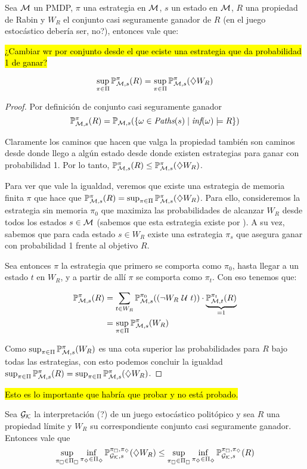 \begin{lemma}
	\label{PMDP-supWR}
	Sea $\mathcal{M}$ un PMDP, $\pi$ una estrategia en $\mathcal{M}$, $s$ un estado en $\mathcal{M}$, $R$ una propiedad de Rabin y $W_R$ el conjunto casi seguramente ganador de $R$ (en el juego estocástico debería ser, no?), entonces vale que:


	\hl{¿Cambiar wr por conjunto desde el que eciste una estrategia que da probabilidad 1 de ganar?}

	$$
		\sup_{\pi \in \Pi} \mathbb{P}_{\mathcal{M}, s}^\pi (R) = \sup_{\pi \in \Pi} \mathbb{P}_{\mathcal{M}, s}^\pi (\diamondsuit W_R)
	$$
\end{lemma}

\begin{proof}
	Por definición de conjunto casi seguramente ganador
	$$
		\mathbb{P}_{\mathcal{M},s}^\pi (R) = \mathbb{P}_{\mathcal{M},s}(\{ \omega \in \textit{Paths}(s) \mid \textit{inf}(\omega) \models R\})
	$$

	Claramente los caminos que hacen que valga la propiedad también son caminos
	desde donde llego a algún estado desde donde existen estrategias para ganar con
	probabilidad 1. Por lo tanto, $\mathbb{P}_{\mathcal{M}, s}^\pi (R) \leq \mathbb{P}_{\mathcal{M}, s}^\pi (\diamondsuit W_R)$.

	Para ver que vale la igualdad, veremos que existe una estrategia de memoria
	finita $\pi$ que hace que $\mathbb{P}_{\mathcal{M}, s}^\pi (R) = \sup_{\pi \in \Pi} \mathbb{P}_{\mathcal{M}, s}^\pi (\diamondsuit
		W_R) $. Para ello, consideremos la estrategia sin memoria $\pi_0$ que maximiza
	las probabilidades de alcanzar $W_R$ desde todos los estados $s \in \mathcal{M}$
	(sabemos que esta estrategia existe por \cite{Polytopal, CONDON1992}). A su
	vez, sabemos que para cada estado $s \in W_R$ existe una estrategia $\pi_s$ que
	asegura ganar con probabilidad 1 frente al objetivo $R$.

	Sea entonces $\pi$ la estrategia que primero se comporta como $\pi_0$, hasta
	llegar a un estado $t$ en $W_R$, y a partir de allí $\pi$ se comporta como
	$\pi_t$. Con eso tenemos que:

	\begin{align*}
		\mathbb{P}_{\mathcal{M}, s}^\pi (R) &= \sum_{t \in W_R} \mathbb{P}_{\mathcal{M},s}^{\pi_0} ((\neg W_R \ \mathcal{U} \  t)) \cdot \underbrace{\mathbb{P}_{\mathcal{M},t}^{\pi_t}(R)}_{=1} \\
		&= \sup_{\pi \in \Pi} \mathbb{P}_{\mathcal{M}, s}^\pi (W_R)
	\end{align*}

	Como $\sup_{\pi \in \Pi} \mathbb{P}_{\mathcal{M}, s}^\pi (W_R)$ es una cota superior las
	probabilidades para $R$ bajo todas las estrategias, con esto podemos concluir
	la igualdad $\sup_{\pi \in \Pi} \mathbb{P}_{\mathcal{M}, s}^\pi (R) = \sup_{\pi \in \Pi} \mathbb{P}_{\mathcal{M}, s}^\pi
		(\diamondsuit W_R)$.
\end{proof}

\hl{Esto es lo importante que habría que probar y no está probado.}

\begin{lemma}
	\label{**2}
	Sea $\mathcal{G}_{\mathcal{K}}$ la interpretación (?) de un juego estocástico politópico y sea $R$ una propiedad límite y $W_R$ su correspondiente conjunto casi seguramente ganador. Entonces vale que
	$$
		\sup_{\pi_\square \in \Pi_\square} \inf_{\pi_\diamondsuit \in \Pi_\diamondsuit} \mathbb{P}_{\mathcal{G}_{\mathcal{K}}, s}^{\pi_\square, \pi_\diamondsuit} (\diamondsuit W_R) \leq \sup_{\pi_\square \in \Pi_\square} \inf_{\pi_\diamondsuit \in \Pi_\diamondsuit}  \mathbb{P}_{\mathcal{G}_{\mathcal{K}}, s}^{\pi_\square, \pi_\diamondsuit} (R)
	$$
\end{lemma}

